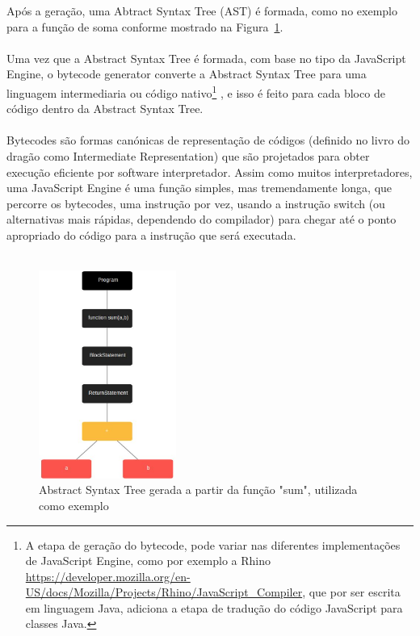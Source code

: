 \documentclass[12pt,a4paper]{article}
\begin{document}
Após a geração, uma Abtract Syntax Tree (AST) é formada, como no exemplo para a função de soma conforme mostrado na Figura~\ref{fig:figura4}. \\
\\
Uma vez que a Abstract Syntax Tree é formada, com base no tipo da JavaScript Engine, o bytecode generator converte a Abstract Syntax Tree para uma linguagem intermediaria ou código nativo\footnote{A etapa de geração do bytecode, pode variar nas diferentes implementações de JavaScript Engine, como por exemplo a Rhino \url{https://developer.mozilla.org/en-US/docs/Mozilla/Projects/Rhino/JavaScript_Compiler}, que por ser escrita em linguagem Java, adiciona a etapa de tradução do código JavaScript para classes Java.} , e isso é feito para cada bloco de código dentro da Abstract Syntax Tree. \\
\\
Bytecodes são formas canónicas de representação de códigos (definido no livro do dragão como Intermediate Representation) que são projetados para obter execução eficiente por software interpretador. Assim como muitos interpretadores, uma JavaScript Engine é uma função simples, mas tremendamente longa, que percorre os bytecodes, uma instrução por vez, usando a instrução switch (ou alternativas mais rápidas, dependendo do compilador) para chegar até o ponto apropriado do código para a instrução que será executada. \\
\\
\begin{figure}[h]
	\centering
	\includegraphics[width=0.4\textwidth]{figura4.png}
	\caption{Abstract Syntax Tree gerada a partir da função "sum", utilizada como exemplo}
	\label{fig:figura4}
\end{figure}
\end{document}
